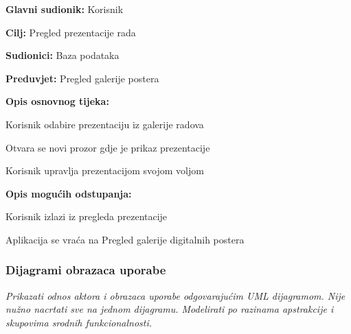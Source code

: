 					\noindent {}
					\begin{packed_item}
						
						\item \textbf{Glavni sudionik: }Korisnik
						\item  \textbf{Cilj:} Pregled prezentacije rada
						\item  \textbf{Sudionici:} Baza podataka
						\item  \textbf{Preduvjet:} Pregled galerije postera
						\item  \textbf{Opis osnovnog tijeka:}
						
						\item[] \begin{packed_enum}
							
							\item Korisnik odabire prezentaciju iz galerije radova
							\item Otvara se novi prozor gdje je prikaz prezentacije
							\item Korisnik upravlja prezentacijom svojom voljom

						\end{packed_enum}
						
						\item  \textbf{Opis mogućih odstupanja:}
						
						\item[] \begin{packed_item}
							
							\item[3.a] Korisnik izlazi iz pregleda prezentacije
							\item[] \begin{packed_enum}
								
								\item Aplikacija se vraća na Pregled galerije digitalnih postera
								
							\end{packed_enum}							
						\end{packed_item}
					\end{packed_item}											
					
				\subsubsection{Dijagrami obrazaca uporabe}
					
					\textit{Prikazati odnos aktora i obrazaca uporabe odgovarajućim UML dijagramom. Nije nužno nacrtati sve na jednom dijagramu. Modelirati po razinama apstrakcije i skupovima srodnih funkcionalnosti.}
				\eject		
				
